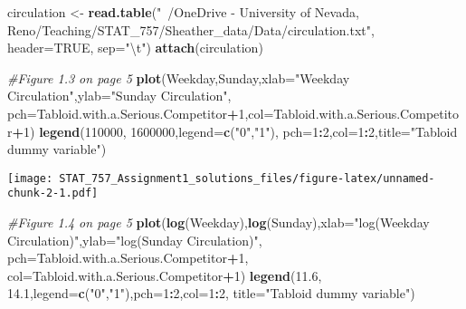 \documentclass[]{article}
\newenvironment{Shaded}{\begin{snugshade}}{\end{snugshade}}
\newcommand{\CharTok}[1]{\textcolor[rgb]{0.31,0.60,0.02}{#1}}
\newcommand{\CommentTok}[1]{\textcolor[rgb]{0.56,0.35,0.01}{\textit{#1}}}
\newcommand{\DataTypeTok}[1]{\textcolor[rgb]{0.13,0.29,0.53}{#1}}
\newcommand{\DecValTok}[1]{\textcolor[rgb]{0.00,0.00,0.81}{#1}}
\newcommand{\FloatTok}[1]{\textcolor[rgb]{0.00,0.00,0.81}{#1}}
\newcommand{\KeywordTok}[1]{\textcolor[rgb]{0.13,0.29,0.53}{\textbf{#1}}}
\newcommand{\NormalTok}[1]{#1}
\newcommand{\OperatorTok}[1]{\textcolor[rgb]{0.81,0.36,0.00}{\textbf{#1}}}
\newcommand{\OtherTok}[1]{\textcolor[rgb]{0.56,0.35,0.01}{#1}}
\newcommand{\StringTok}[1]{\textcolor[rgb]{0.31,0.60,0.02}{#1}}
\begin{document}
\begin{Shaded}
\begin{Highlighting}[]
\NormalTok{circulation <-}\StringTok{ }\KeywordTok{read.table}\NormalTok{(}\StringTok{"~/OneDrive - University of Nevada, Reno/Teaching/STAT_757/Sheather_data/Data/circulation.txt"}\NormalTok{, }\DataTypeTok{header=}\OtherTok{TRUE}\NormalTok{, }\DataTypeTok{sep=}\StringTok{"}\CharTok{\textbackslash{}t}\StringTok{"}\NormalTok{)}
\KeywordTok{attach}\NormalTok{(circulation)}

\CommentTok{#Figure 1.3 on page 5}
\KeywordTok{plot}\NormalTok{(Weekday,Sunday,}\DataTypeTok{xlab=}\StringTok{"Weekday Circulation"}\NormalTok{,}\DataTypeTok{ylab=}\StringTok{"Sunday Circulation"}\NormalTok{,}
\DataTypeTok{pch=}\NormalTok{Tabloid.with.a.Serious.Competitor}\OperatorTok{+}\DecValTok{1}\NormalTok{,}\DataTypeTok{col=}\NormalTok{Tabloid.with.a.Serious.Competitor}\OperatorTok{+}\DecValTok{1}\NormalTok{)}
\KeywordTok{legend}\NormalTok{(}\DecValTok{110000}\NormalTok{, }\DecValTok{1600000}\NormalTok{,}\DataTypeTok{legend=}\KeywordTok{c}\NormalTok{(}\StringTok{"0"}\NormalTok{,}\StringTok{"1"}\NormalTok{),}
\DataTypeTok{pch=}\DecValTok{1}\OperatorTok{:}\DecValTok{2}\NormalTok{,}\DataTypeTok{col=}\DecValTok{1}\OperatorTok{:}\DecValTok{2}\NormalTok{,}\DataTypeTok{title=}\StringTok{"Tabloid dummy variable"}\NormalTok{)}
\end{Highlighting}
\end{Shaded}

\texttt{[image: STAT\_757\_Assignment1\_solutions\_files/figure-latex/unnamed-chunk-2-1.pdf]}

\begin{Shaded}
\begin{Highlighting}[]
\CommentTok{#Figure 1.4 on page 5}
\KeywordTok{plot}\NormalTok{(}\KeywordTok{log}\NormalTok{(Weekday),}\KeywordTok{log}\NormalTok{(Sunday),}\DataTypeTok{xlab=}\StringTok{"log(Weekday Circulation)"}\NormalTok{,}\DataTypeTok{ylab=}\StringTok{"log(Sunday Circulation)"}\NormalTok{,}
\DataTypeTok{pch=}\NormalTok{Tabloid.with.a.Serious.Competitor}\OperatorTok{+}\DecValTok{1}\NormalTok{,}
\DataTypeTok{col=}\NormalTok{Tabloid.with.a.Serious.Competitor}\OperatorTok{+}\DecValTok{1}\NormalTok{)}
\KeywordTok{legend}\NormalTok{(}\FloatTok{11.6}\NormalTok{, }\FloatTok{14.1}\NormalTok{,}\DataTypeTok{legend=}\KeywordTok{c}\NormalTok{(}\StringTok{"0"}\NormalTok{,}\StringTok{"1"}\NormalTok{),}\DataTypeTok{pch=}\DecValTok{1}\OperatorTok{:}\DecValTok{2}\NormalTok{,}\DataTypeTok{col=}\DecValTok{1}\OperatorTok{:}\DecValTok{2}\NormalTok{,}
\DataTypeTok{title=}\StringTok{"Tabloid dummy variable"}\NormalTok{)}
\end{Highlighting}
\end{Shaded}
\end{document}
